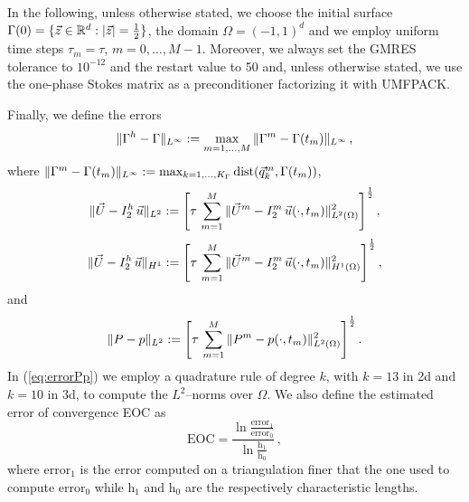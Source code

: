 In the following, unless otherwise stated, we choose the initial surface
$\Gamma(0) = \{ \vec z \in {\mathbb R}^d : |\vec z| = \frac12 \}$, the domain
$\Omega = (-1,1)^d$ and we employ uniform time steps $\tau_m=\tau$,
$m=0,\ldots, M-1$. Moreover, we always set the GMRES tolerance to $10^{-12}$ and
the restart value to 50 and, unless otherwise stated, we use the one-phase
Stokes matrix as a preconditioner factorizing it with UMFPACK.

Finally, we define the errors
\begin{equation} \label{eq:errorXx}
\|\Gamma^h - \Gamma\|_{L^\infty} := \max_{m=1,\ldots, M} \|\Gamma^m - \Gamma(t_m)\|_{L^\infty}\,,
\end{equation}
where $\|\Gamma^m - \Gamma(t_m)\|_{L^\infty} :=
\max_{k=1,\ldots, K_\Gamma} {\rm dist}( \vec{q}^m_k, \Gamma(t_m))$,
\begin{equation} \label{eq:errorLUu}
\|\vec U - I^h_{2}\,\vec u\|_{L^2} := \left[\tau\,\sum_{m=1}^M \|\vec U^m - I^m_2\,\vec u(\cdot,
t_m)\|_{L^2(\Omega)}^2 \right]^\frac12,
\end{equation}
\begin{equation} \label{eq:errorHUu}
\|\vec U - I^h_{2}\,\vec u\|_{H^1} := \left[\tau\,\sum_{m=1}^M \|\vec U^m - I^m_2\,\vec u(\cdot,
t_m)\|_{H^1(\Omega)}^2 \right]^\frac12,
\end{equation}
and
\begin{equation} \label{eq:errorPp}
\|P - p\|_{L^2} := \left[\tau\,\sum_{m=1}^M \|P^m - p(\cdot,t_m)\|_{L^2(\Omega)}^2
\right]^\frac12.
\end{equation}
In (\ref{eq:errorPp}) we employ a quadrature rule of degree $k$, with $k=13$ in
2d and $k=10$ in 3d, to compute the $L^2$--norms over $\Omega$. We also define
the estimated error of convergence EOC as
\begin{equation} \label{eq:eoc}
\mbox{EOC}=\frac{\ln{\frac{\mbox{error}_1}{\mbox{error}_0}}}
{\ln{\frac{\mbox{h}_1}{\mbox{h}_0}}}\,,
\end{equation}
where $\mbox{error}_1$ is the error computed on a triangulation finer that the
one used to compute $\mbox{error}_0$ while $\mbox{h}_1$ and $\mbox{h}_0$ are the
respectively characteristic lengths.

